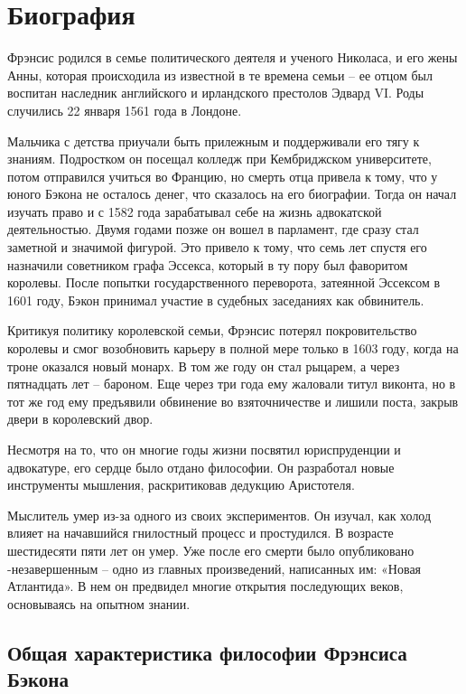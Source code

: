 \documentclass[a4paper, 14pt]{extreport}
\begin{document}
\section{Биография}

Фрэнсис родился в семье политического деятеля и ученого Николаса, и его
жены Анны, которая происходила из известной в те времена семьи -- ее
отцом был воспитан наследник английского и ирландского престолов Эдвард
VI. Роды случились 22 января 1561 года в Лондоне.

Мальчика с детства приучали быть прилежным и поддерживали его тягу к
знаниям. Подростком он посещал колледж при Кембриджском университете,
потом отправился учиться во Францию, но смерть отца привела к тому, что
у юного Бэкона не осталось денег, что сказалось на его биографии. Тогда
он начал изучать право и с 1582 года зарабатывал себе на жизнь
адвокатской деятельностью. Двумя годами позже он вошел в парламент, где
сразу стал заметной и значимой фигурой. Это привело к тому, что семь лет
спустя его назначили советником графа Эссекса, который в ту пору был
фаворитом королевы. После попытки государственного переворота, затеянной
Эссексом в 1601 году, Бэкон принимал участие в судебных заседаниях как
обвинитель.

Критикуя политику королевской семьи, Фрэнсис потерял покровительство
королевы и смог возобновить карьеру в полной мере только в 1603 году,
когда на троне оказался новый монарх. В том же году он стал рыцарем, а
через пятнадцать лет -- бароном. Еще через три года ему жаловали титул
виконта, но в тот же год ему предъявили обвинение во взяточничестве и
лишили поста, закрыв двери в королевский двор.

Несмотря на то, что он многие годы жизни посвятил юриспруденции и
адвокатуре, его сердце было отдано философии. Он разработал новые
инструменты мышления, раскритиковав дедукцию Аристотеля.

Мыслитель умер из-за одного из своих экспериментов. Он изучал, как холод
влияет на начавшийся гнилостный процесс и простудился. В возрасте
шестидесяти пяти лет он умер. Уже после его смерти было опубликовано
-незавершенным -- одно из главных произведений, написанных им: «Новая
Атлантида». В нем он предвидел многие открытия последующих веков,
основываясь на опытном знании.

\subsection{Общая характеристика философии Фрэнсиса Бэкона}
\end{document}
